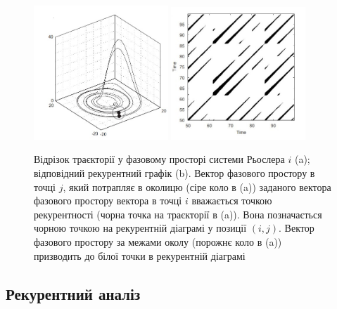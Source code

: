\documentclass[
  letterpaper,
]{report}
\begin{document}
\begin{figure}

\begin{minipage}[t]{\linewidth}

{\centering 

\includegraphics[width=0.45\textwidth,height=\textheight]{Images/lab_2/2_1.jpg}
\includegraphics[width=0.45\textwidth,height=\textheight]{Images/lab_2/2_2.jpg}

}

\end{minipage}%

\caption{\label{fig-recurrence}Відрізок траєкторії у фазовому просторі
системи Рьослера \(i\) (a); відповідний рекурентний графік (b). Вектор
фазового простору в точці \(j\), який потрапляє в околицю (сіре коло в
(a)) заданого вектора фазового простору вектора в точці \(i\) вважається
точкою рекурентності (чорна точка на траєкторії в (a)). Вона
позначається чорною точкою на рекурентній діаграмі у позиції \((i, j)\).
Вектор фазового простору за межами околу (порожнє коло в (a)) призводить
до білої точки в рекурентній діаграмі}

\end{figure}

\hypertarget{ux440ux435ux43aux443ux440ux435ux43dux442ux43dux438ux439-ux430ux43dux430ux43bux456ux437}{%
\subsection{Рекурентний
аналіз}\label{ux440ux435ux43aux443ux440ux435ux43dux442ux43dux438ux439-ux430ux43dux430ux43bux456ux437}}
\end{document}
